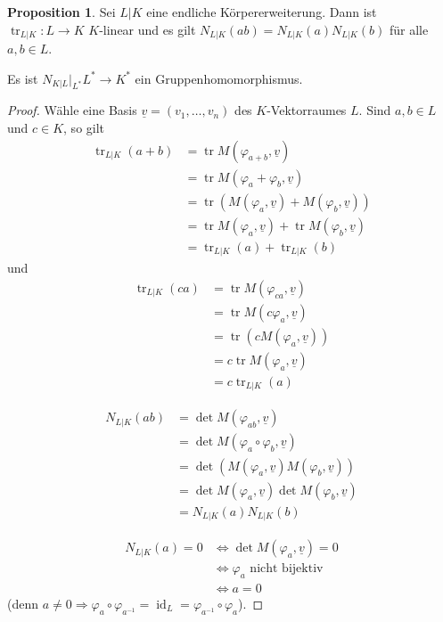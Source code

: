 \documentclass[
twoside=semi,
fontsize=12,
DIV=12, 
cleardoublepage=current,
leqno,
headings=optiontoheadandtoc, 
toc=idx
]{scrbook}
\DeclareMathOperator{\id}{id}
\DeclareMathOperator{\tr}{tr}
\theoremstyle{definition}
\newtheorem{proposition}[definition]{Proposition}
\begin{document}
	\begin{proposition}\label{2.4.3}\hfill\newline
		Sei $L|K$ eine endliche K\"orpererweiterung. Dann ist $\tr_{L|K}:L \to K$ $K$-linear und es gilt $N_{L|K}(ab) = N_{L|K}(a)N_{L|K}(b)$ f\"ur alle $a,b \in L$.
		
		Es ist $N_{K|L}\big|_{L^*} L^* \to K^*$ ein Gruppenhomomorphismus.
		
		\begin{proof}
			W\"ahle eine Basis $\underline{v} = (v_1, \dots, v_n)$ des $K$-Vektorraumes $L$. Sind $a,b \in L$ und $c \in K$, so gilt 
			\begin{align*}
				\tr_{L|K}(a+b) &= \tr M(\varphi_{a+b}, \underline{v})\\
				&= \tr M(\varphi_a + \varphi_b, \underline{v})\\
				&= \tr (M(\varphi_a, \underline{v}) + M(\varphi_b, \underline{v}))\\
				&= \tr M(\varphi_a, \underline{v}) + \tr M(\varphi_b, \underline{v})\\
				&= \tr_{L|K}(a) + \tr_{L|K}(b)
			\end{align*}
			und 
			\begin{align*}
				\tr_{L|K}(ca) &= \tr M(\varphi_{ca}, \underline{v})\\
				&= \tr M(c\varphi_{a}, \underline{v})\\
				&= \tr (cM(\varphi_{a}, \underline{v}))\\
				&= c \tr M(\varphi_{a}, \underline{v})\\
				&= c \tr_{L|K}(a)
			\end{align*}
			
			\begin{align*}
				N_{L|K}(ab) &= \det M(\varphi_{ab}, \underline{v})\\
				&=\det M(\varphi_{a} \circ \varphi_b, \underline{v})\\
				&=\det (M(\varphi_{a}, \underline{v}) M(\varphi_b, \underline{v}))\\
				&=\det M(\varphi_{a}, \underline{v}) \det M(\varphi_b, \underline{v})\\
				&= N_{L|K}(a)N_{L|K}(b)
			\end{align*}
		
			\begin{align*}
				N_{L|K}(a) = 0 &\Leftrightarrow \det M(\varphi_{a}, \underline{v}) = 0\\
				&\Leftrightarrow \varphi_{a} \textrm{ nicht bijektiv}\\
				&\Leftrightarrow a = 0
			\end{align*}
			(denn $a\neq 0 \Rightarrow \varphi_{a} \circ \varphi_{a^{-1}} = \id_L = \varphi_{a^{-1}} \circ \varphi_{a}$).
		\end{proof} 
	\end{proposition}
\end{document}
